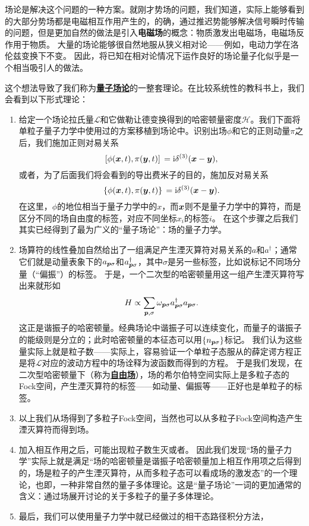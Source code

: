 \documentclass[hyperref, UTF8, a4paper]{ctexbook}
\newcommand*{\ii}{\mathrm{i}}
\newcommand{\concept}[1]{\underline{\textbf{#1}}}
\renewcommand{\emph}{\textbf}
\begin{document}
场论是解决这个问题的一种方案。就刚才势场的问题，我们知道，实际上能够看到的大部分势场都是电磁相互作用产生的，的确，通过推迟势能够解决信号瞬时传输的问题，但是更加自然的做法是引入\emph{电磁场}的概念：物质激发出电磁场，电磁场反作用于物质。
大量的场论能够很自然地服从狭义相对论——例如，电动力学在洛伦兹变换下不变。
因此，将已知在相对论情况下运作良好的场论量子化似乎是一个相当吸引人的做法。

这个想法导致了我们称为\concept{量子场论}的一整套理论。在比较系统性的教科书上，我们会看到以下形式理论：
\begin{enumerate}
    \item 给定一个场论拉氏量$\mathcal{L}$和它做勒让德变换得到的哈密顿量密度$\mathcal{H}$。我们下面将单粒子量子力学中使用过的方案移植到场论中。识别出场$\phi$和它的正则动量$\pi$之后，我们施加正则对易关系
    \begin{equation}
        \comm*{\phi(\vb*{x}, t)}{\pi(\vb*{y}, t)} = \ii \delta^{(3)}(\vb*{x} - \vb*{y}),
    \end{equation}
    或者，为了后面我们将会看到的导出费米子的目的，施加反对易关系
    \begin{equation}
        \acomm*{\phi(\vb*{x}, t)}{\pi(\vb*{y}, t)} = \ii \delta^{(3)}(\vb*{x} - \vb*{y}).
    \end{equation}
    在这里，$\phi$的地位相当于量子力学中的$x$，而$\vb*{x}$则不是量子力学中的算符，而是区分不同的场自由度的标签，对应不同坐标$x_i$的标签$i$。
    在这个步骤之后我们其实已经得到了最为广义的“量子场论”：场的量子力学。
    \item 场算符的线性叠加自然给出了一组满足产生湮灭算符对易关系的$a$和$a^\dagger$；通常它们就是动量表象下的$a_{\vb*{p} \sigma}$和$a^\dagger_{\vb*{p} \sigma}$，其中$\sigma$是另一些标签，比如说标记不同场分量（“偏振”）的标签。
    于是，一个二次型的哈密顿量用这一组产生湮灭算符写出来就形如
    \begin{equation}
        H \propto \sum_{\vb*{p}, \sigma} \omega_{\vb*{p} \sigma} a^\dagger_{\vb*{p} \sigma} a_{\vb*{p} \sigma}.
    \end{equation}
    这正是谐振子的哈密顿量。经典场论中谐振子可以连续变化，而量子的谐振子的能级则是分立的；此时哈密顿量的本征态可以用$\{n_{\vb*{p} \sigma}\}$标记。
    我们认为这些量实际上就是粒子数——实际上，容易验证一个单粒子态服从的薛定谔方程正是将$\mathcal{L}$对应的波动方程中的场诠释为波函数而得到的方程。
    于是我们发现，在二次型哈密顿量下（称为\concept{自由场}），场的希尔伯特空间实际上是多粒子态的Fock空间，产生湮灭算符的标签——如动量、偏振等——正好也是单粒子的标签。
    \item 以上我们从场得到了多粒子Fock空间，当然也可以从多粒子Fock空间构造产生湮灭算符而得到场。
    \item 加入相互作用之后，可能出现粒子数生灭或者。
    因此我们发现“场的量子力学”实际上就是满足“场的哈密顿量是谐振子哈密顿量加上相互作用项之后得到的，场是粒子的产生湮灭算符，从而多粒子态可以看成场的激发态”的一个理论，也即，一种非常自然的量子多体理论。这是“量子场论”一词的更加通常的含义：通过场展开讨论的关于多粒子的量子多体理论。
    \item 最后，我们可以使用量子力学中就已经做过的相干态路径积分方法，%
\end{enumerate}
\end{document}
